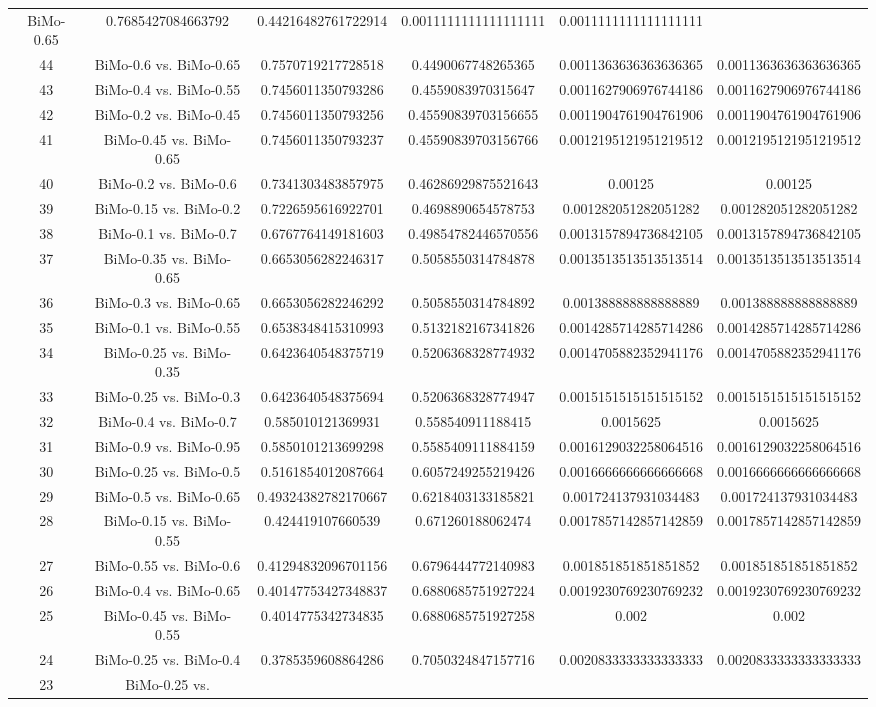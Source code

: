 \documentclass[a4paper,10pt]{article}
\begin{document}
\begin{landscape}
\begin{table}[!htp]
\begin{tabular}{cccccc}
BiMo-0.65&0.7685427084663792&0.44216482761722914&0.0011111111111111111&0.0011111111111111111\\44&BiMo-0.6 vs. BiMo-0.65&0.7570719217728518&0.4490067748265365&0.0011363636363636365&0.0011363636363636365\\43&BiMo-0.4 vs. BiMo-0.55&0.7456011350793286&0.4559083970315647&0.0011627906976744186&0.0011627906976744186\\42&BiMo-0.2 vs. BiMo-0.45&0.7456011350793256&0.45590839703156655&0.0011904761904761906&0.0011904761904761906\\41&BiMo-0.45 vs. BiMo-0.65&0.7456011350793237&0.45590839703156766&0.0012195121951219512&0.0012195121951219512\\40&BiMo-0.2 vs. BiMo-0.6&0.7341303483857975&0.46286929875521643&0.00125&0.00125\\39&BiMo-0.15 vs. BiMo-0.2&0.7226595616922701&0.4698890654578753&0.001282051282051282&0.001282051282051282\\38&BiMo-0.1 vs. BiMo-0.7&0.6767764149181603&0.49854782446570556&0.0013157894736842105&0.0013157894736842105\\37&BiMo-0.35 vs. BiMo-0.65&0.6653056282246317&0.5058550314784878&0.0013513513513513514&0.0013513513513513514\\36&BiMo-0.3 vs. BiMo-0.65&0.6653056282246292&0.5058550314784892&0.001388888888888889&0.001388888888888889\\35&BiMo-0.1 vs. BiMo-0.55&0.6538348415310993&0.5132182167341826&0.0014285714285714286&0.0014285714285714286\\34&BiMo-0.25 vs. BiMo-0.35&0.6423640548375719&0.5206368328774932&0.0014705882352941176&0.0014705882352941176\\33&BiMo-0.25 vs. BiMo-0.3&0.6423640548375694&0.5206368328774947&0.0015151515151515152&0.0015151515151515152\\32&BiMo-0.4 vs. BiMo-0.7&0.585010121369931&0.558540911188415&0.0015625&0.0015625\\31&BiMo-0.9 vs. BiMo-0.95&0.5850101213699298&0.5585409111884159&0.0016129032258064516&0.0016129032258064516\\30&BiMo-0.25 vs. BiMo-0.5&0.5161854012087664&0.6057249255219426&0.0016666666666666668&0.0016666666666666668\\29&BiMo-0.5 vs. BiMo-0.65&0.49324382782170667&0.6218403133185821&0.001724137931034483&0.001724137931034483\\28&BiMo-0.15 vs. BiMo-0.55&0.424419107660539&0.671260188062474&0.0017857142857142859&0.0017857142857142859\\27&BiMo-0.55 vs. BiMo-0.6&0.41294832096701156&0.6796444772140983&0.001851851851851852&0.001851851851851852\\26&BiMo-0.4 vs. BiMo-0.65&0.40147753427348837&0.6880685751927224&0.0019230769230769232&0.0019230769230769232\\25&BiMo-0.45 vs. BiMo-0.55&0.4014775342734835&0.6880685751927258&0.002&0.002\\24&BiMo-0.25 vs. BiMo-0.4&0.3785359608864286&0.7050324847157716&0.0020833333333333333&0.0020833333333333333\\23&BiMo-0.25 vs. 
\end{tabular}
\end{table}
\end{landscape}
\end{document}
